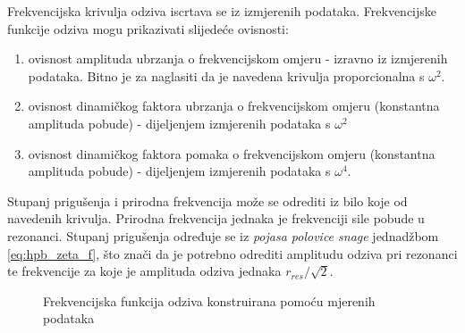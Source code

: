 Frekvencijska krivulja odziva iscrtava se iz izmjerenih podataka. Frekvencijske
funkcije odziva mogu prikazivati slijedeće ovisnosti:
\begin{enumerate}
    \item ovisnost amplituda ubrzanja o frekvencijskom omjeru - izravno iz
        izmjerenih podataka. Bitno je za naglasiti da je navedena krivulja
        proporcionalna s $\omega^2$.

    \item ovisnost dinamičkog faktora ubrzanja o frekvencijskom omjeru (konstantna
        amplituda pobude) - dijeljenjem izmjerenih podataka s $\omega^2$ 

    \item ovisnost dinamičkog faktora pomaka o frekvencijskom omjeru (konstantna
        amplituda pobude) - dijeljenjem izmjerenih podataka s $\omega^4$.
\end{enumerate}

Stupanj prigušenja i prirodna frekvencija može se odrediti iz bilo koje od navedenih
krivulja. Prirodna frekvencija jednaka je frekvenciji sile pobude u rezonanci.
Stupanj prigušenja određuje se iz \textit{pojasa polovice snage} jednadžbom
\eqref{eq:hpb_zeta_f}, što znači da je potrebno odrediti amplitudu odziva pri
rezonanci te frekvencije za koje je amplituda odziva jednaka $r_{res}/\sqrt{2}$.
\begin{figure}[H]
    
    \caption{Frekvencijska funkcija odziva konstruirana pomoću mjerenih podataka}
    \label{fig:frf-poku}
\end{figure}
